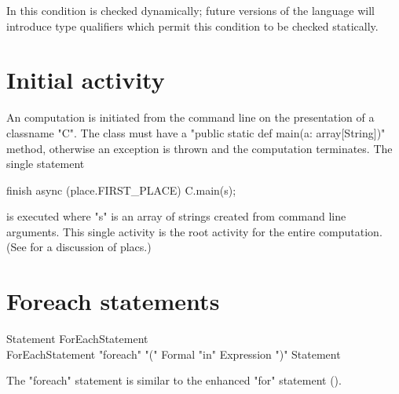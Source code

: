 In \XtenCurrVer{} this condition is checked dynamically; future
versions of the language will introduce type qualifiers which permit
this condition to be checked statically.


\section{Initial activity}\label{initial-computation}

An \Xten{} computation is initiated from the command line on the
presentation of a classname \xcd"C". The class must have a
\xcd"public static def main(a: array[String])" method, otherwise an
exception is thrown
and the computation terminates.  The single statement
\begin{xten}
finish async (place.FIRST_PLACE) {
  C.main(s);
}
\end{xten} 
\noindent is executed where \xcd"s" is an array of strings created
from command line arguments. This single activity is the root activity
for the entire computation. (See  for a discussion of
placs.)


\section{Foreach statements}
\label{ForLoop}


\begin{grammar}
Statement \: ForEachStatement \\
ForEachStatement \: 
      \xcd"foreach" \xcd"(" Formal \xcd"in" Expression \xcd")"
          Statement \\
\end{grammar}

The \xcd"foreach" statement is similar to the enhanced \xcd"for"
statement ().

